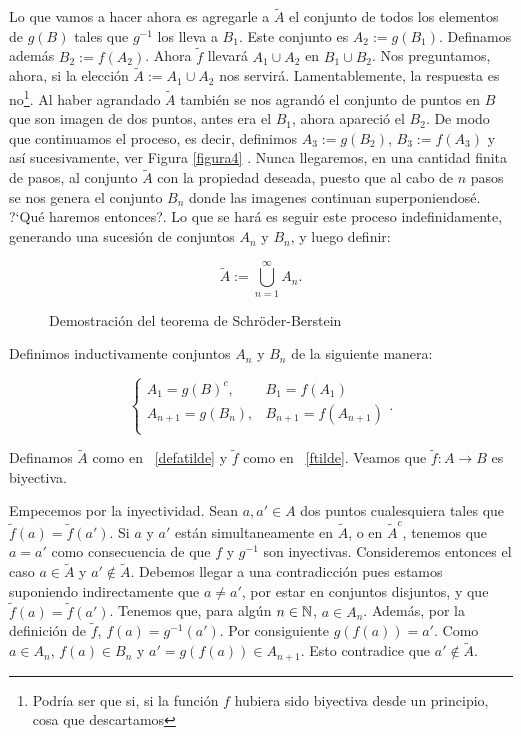 \begin{demo}
Lo que vamos
a hacer ahora es agregarle a $\tilde{A}$ el conjunto de todos los
elementos de $g(B)$ tales que $g^{-1}$ los lleva a $B_1$. Este
conjunto es $A_2:=g(B_1)$. Definamos además $B_2:=f(A_2)$. Ahora
$\tilde{f}$ llevará $A_1\cup A_2$ en $B_1\cup B_2$. Nos
preguntamos, ahora, si la elección $\tilde{A}:=A_1\cup A_2$ nos
servirá. Lamentablemente, la respuesta es
no\footnote{Podría ser que si, si la función $f$ hubiera
sido biyectiva desde un principio, cosa que descartamos}. Al haber
agrandado $\tilde{A}$ también se nos agrandó el conjunto
de puntos en $B$ que son imagen de dos puntos, antes era el $B_1$,
ahora apareció el $B_2$. De modo que continuamos el proceso,
es decir, definimos $A_3:=g(B_2)$, $B_3:=f(A_3)$ y así
sucesivamente, ver Figura \vref{figura4} . Nunca llegaremos, en
una cantidad finita de pasos, al conjunto $\tilde{A}$ con la
propiedad deseada, puesto que al cabo de $n$ pasos se nos genera
el conjunto $B_n$ donde las imagenes continuan superponiendosé.
?`Qué haremos entonces?. Lo que se hará es seguir este proceso
indefinidamente, generando una sucesión de conjuntos $A_n$ y
$B_n$, y luego definir:

\begin{equation}\label{defatilde}
\tilde{A}:=\bigcup_{n=1}^{\infty}A_n.
\end{equation}


\begin{figure}[h]
 \begin{center}
\end{center}
 \caption{Demostración del teorema de Schr\"oder-Berstein}\label{figura4}
\end{figure}

Definimos inductivamente conjuntos $A_n$ y $B_n$
de la siguiente manera:

\[\left\{%
\begin{array}{ll}
    A_1=g(B)^c, & B_1=f(A_1) \\
    A_{n+1}=g(B_n), & B_{n+1}=f(A_{n+1}) \\
\end{array}%
\right..\]

Definamos $\tilde{A}$  como en ~\eqref{defatilde} y $\tilde{f}$
como en ~\eqref{ftilde}. Veamos que $\tilde{f}:A\longrightarrow B$
es biyectiva.

Empecemos por la inyectividad. Sean $a,a'\in A$ dos puntos cualesquiera tales que
$\tilde{f}(a)=\tilde{f}(a')$. Si $a$ y $a'$ están
simultaneamente en $\tilde{A}$, o en $\tilde{A}^c$, tenemos que
$a=a'$ como consecuencia de que $f$ y $g^{-1}$ son inyectivas.
Consideremos entonces el caso $a\in\tilde{A}$ y $a'\notin
\tilde{A}$. Debemos llegar a una contradicción pues estamos
suponiendo indirectamente que $a\neq a'$, por estar en conjuntos
disjuntos, y que $\tilde{f}(a)=\tilde{f}(a')$. Tenemos que, para
algún $n\in\mathbb{N}$, $a\in A_n$. Además, por la definición de
$\tilde{f}$,  $f(a)=g^{-1}(a')$. Por consiguiente
$g(f(a))=a'$. Como $a\in A_n$, $f(a)\in B_n$ y $a'=g(f(a))\in
A_{n+1}$. Esto contradice que $a'\notin\tilde{A}$.


\end{demo}
